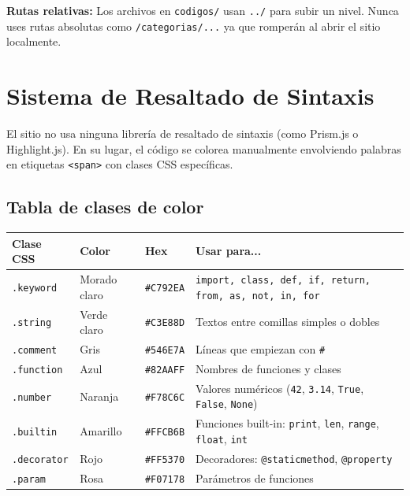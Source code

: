 \documentclass[12pt, a4paper]{article}
\newcommand{\archivo}[1]{\texttt{\textcolor{cpAccent}{#1}}}
\newcommand{\clase}[1]{\texttt{\textcolor{cpAzul}{.#1}}}
\newcommand{\etiquetaHtml}[1]{\texttt{\textcolor{cpKeyword}{<#1>}}}
\begin{document}
\begin{cajaAviso}
    \textbf{Rutas relativas:} Los archivos en \archivo{codigos/} usan
    \texttt{../} para subir un nivel. Nunca uses rutas absolutas como
    \texttt{/categorias/...} ya que romperán al abrir el sitio localmente.
\end{cajaAviso}


\section{Sistema de Resaltado de Sintaxis}

El sitio no usa ninguna librería de resaltado de sintaxis (como Prism.js o
Highlight.js). En su lugar, el código se colorea manualmente envolviendo
palabras en etiquetas \etiquetaHtml{span} con clases CSS específicas.

\subsection{Tabla de clases de color}

\begin{center}
\begin{tabular}{llll}
\toprule
\textbf{Clase CSS} & \textbf{Color} & \textbf{Hex} & \textbf{Usar para...} \\
\midrule
\clase{keyword}   & Morado claro & \texttt{\#C792EA} & \texttt{import, class, def, if, return, from, as, not, in, for} \\
\clase{string}    & Verde claro  & \texttt{\#C3E88D} & Textos entre comillas simples o dobles \\
\clase{comment}   & Gris         & \texttt{\#546E7A} & Líneas que empiezan con \texttt{\#} \\
\clase{function}  & Azul         & \texttt{\#82AAFF} & Nombres de funciones y clases \\
\clase{number}    & Naranja      & \texttt{\#F78C6C} & Valores numéricos (\texttt{42}, \texttt{3.14}, \texttt{True}, \texttt{False}, \texttt{None}) \\
\clase{builtin}   & Amarillo     & \texttt{\#FFCB6B} & Funciones built-in: \texttt{print}, \texttt{len}, \texttt{range}, \texttt{float}, \texttt{int} \\
\clase{decorator} & Rojo         & \texttt{\#FF5370} & Decoradores: \texttt{@staticmethod}, \texttt{@property} \\
\clase{param}     & Rosa         & \texttt{\#F07178} & Parámetros de funciones \\
\bottomrule
\end{tabular}
\end{center}
\end{document}
